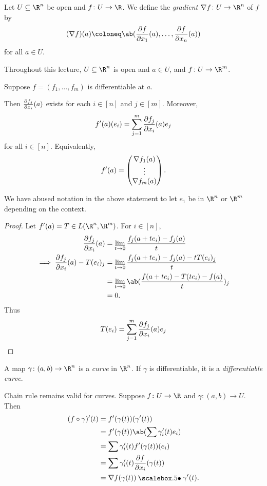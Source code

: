 \begin{definition}[gradient] \label{def:gradient}
    Let $U \subseteq \R^n$ be open and $f\colon U \to \R$.
    We define the \emph{gradient} $\grad f\colon U \to \R^n$ of $f$ by \[
        (\grad f)(a) \coloneq
        \ab(\pdv{f}{x_1}(a), \ldots, \pdv{f}{x_n}(a))
    \] for all $a \in U$.
\end{definition}
Throughout this lecture, $U \subseteq \R^n$ is open and $a \in U$,
and $f\colon U \to \R^m$.

\begin{proposition}
    Suppose $f = (f_1, \dots, f_m)$ is differentiable at $a$.

    Then $\pdv{f_j}{x_i}(a)$ exists for each $i \in [n]$ and $j \in [m]$.
    Moreover, \[
        f'(a)(e_i) = \sum_{j=1}^m \pdv{f_j}{x_i}(a) e_j
    \] for all $i \in [n]$.
    Equivalently, \[
        f'(a) = \begin{pmatrix}
            \nabla f_1(a) \\
            \vdots \\
            \nabla f_m(a)
        \end{pmatrix}.
    \]
\end{proposition}
We have abused notation in the above statement to let $e_1$ be in
$\R^n$ or $\R^m$ depending on the context.
\begin{proof}
    Let $f'(a) = T \in L(\R^n, \R^m)$.
    For $i \in [n]$, \begin{align*}
        \pdv{f_j}{x_i}(a)
            &= \lim_{t \to 0} \frac{f_j(a+te_i) - f_j(a)}{t} \\
        \implies \pdv{f_j}{x_i}(a) - T(e_i)_j
            &= \lim_{t \to 0} \frac{f_j(a+te_i) - f_j(a) - tT(e_i)_j}{t} \\
            &= \lim_{t \to 0} \ab(\frac{f(a+te_i) - T(te_i) - f(a)}t)_j \\
            &= 0.
    \end{align*}
    Thus \[
        T(e_i) = \sum_{j=1}^m \pdv{f_j}{x_i}(a) e_j \qedhere
    \]
\end{proof}

\begin{definition}[curve] \label{def:curve}
    A map $\gamma\colon (a, b) \to \R^n$ is a \emph{curve} in $\R^n$.
    If $\gamma$ is differentiable, it is a \emph{differentiable curve}.
\end{definition}

\begin{remark}
    Chain rule remains valid for curves.
    Suppose $f\colon U \to \R$ and $\gamma\colon (a, b) \to U$.
    Then \begin{align*}
        (f \circ \gamma)'(t) &= f'(\gamma(t))(\gamma'(t)) \\
        &= f'(\gamma(t)) \ab(\sum \gamma_i'(t) e_i) \\
        &= \sum \gamma_i'(t) f'(\gamma(t))(e_i) \\
        &= \sum \gamma_i'(t) \pdv{f}{x_i}(\gamma(t)) \\
        &= \grad f(\gamma(t)) \dotp \gamma'(t).
    \end{align*}
\end{remark}


